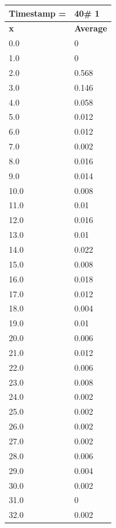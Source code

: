 \begin{tabular}{|l||l|}
\hline
\textbf{Timestamp =} & \textbf{40}\# 1\\\hline
	\textbf{x} & \textbf{Average} \\ \hline
\hline
	0.0 & 0 \\ \hline
	1.0 & 0 \\ \hline
	2.0 & 0.568 \\ \hline
	3.0 & 0.146 \\ \hline
	4.0 & 0.058 \\ \hline
	5.0 & 0.012 \\ \hline
	6.0 & 0.012 \\ \hline
	7.0 & 0.002 \\ \hline
	8.0 & 0.016 \\ \hline
	9.0 & 0.014 \\ \hline
	10.0 & 0.008 \\ \hline
	11.0 & 0.01 \\ \hline
	12.0 & 0.016 \\ \hline
	13.0 & 0.01 \\ \hline
	14.0 & 0.022 \\ \hline
	15.0 & 0.008 \\ \hline
	16.0 & 0.018 \\ \hline
	17.0 & 0.012 \\ \hline
	18.0 & 0.004 \\ \hline
	19.0 & 0.01 \\ \hline
	20.0 & 0.006 \\ \hline
	21.0 & 0.012 \\ \hline
	22.0 & 0.006 \\ \hline
	23.0 & 0.008 \\ \hline
	24.0 & 0.002 \\ \hline
	25.0 & 0.002 \\ \hline
	26.0 & 0.002 \\ \hline
	27.0 & 0.002 \\ \hline
	28.0 & 0.006 \\ \hline
	29.0 & 0.004 \\ \hline
	30.0 & 0.002 \\ \hline
	31.0 & 0 \\ \hline
	32.0 & 0.002 \\ \hline
\end{tabular}
